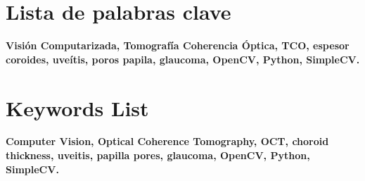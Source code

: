 \chapter{Lista de palabras clave}
\textbf{Visión Computarizada, Tomografía Coherencia Óptica, TCO,
  espesor coroides, uveítis, poros papila, glaucoma, OpenCV,
  \mbox{Python}, SimpleCV.}
\chapter{Keywords List}
\textbf{Computer Vision, Optical Coherence Tomography, OCT, choroid
  thickness, uveitis, papilla pores, glaucoma, OpenCV, Python,
  SimpleCV.}
